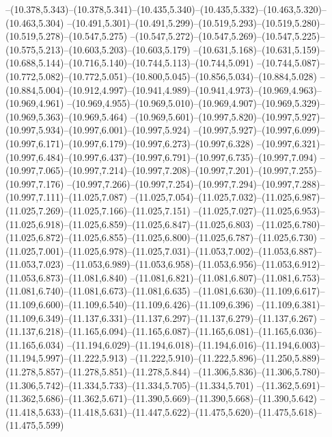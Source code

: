   --(10.378,5.343)--(10.378,5.341)--(10.435,5.340)--(10.435,5.332)--(10.463,5.320)--(10.463,5.304)%
  --(10.491,5.301)--(10.491,5.299)--(10.519,5.293)--(10.519,5.280)--(10.519,5.278)--(10.547,5.275)%
  --(10.547,5.272)--(10.547,5.269)--(10.547,5.225)--(10.575,5.213)--(10.603,5.203)--(10.603,5.179)%
  --(10.631,5.168)--(10.631,5.159)--(10.688,5.144)--(10.716,5.140)--(10.744,5.113)--(10.744,5.091)%
  --(10.744,5.087)--(10.772,5.082)--(10.772,5.051)--(10.800,5.045)--(10.856,5.034)--(10.884,5.028)%
  --(10.884,5.004)--(10.912,4.997)--(10.941,4.989)--(10.941,4.973)--(10.969,4.963)--(10.969,4.961)%
  --(10.969,4.955)--(10.969,5.010)--(10.969,4.907)--(10.969,5.329)--(10.969,5.363)--(10.969,5.464)%
  --(10.969,5.601)--(10.997,5.820)--(10.997,5.927)--(10.997,5.934)--(10.997,6.001)--(10.997,5.924)%
  --(10.997,5.927)--(10.997,6.099)--(10.997,6.171)--(10.997,6.179)--(10.997,6.273)--(10.997,6.328)%
  --(10.997,6.321)--(10.997,6.484)--(10.997,6.437)--(10.997,6.791)--(10.997,6.735)--(10.997,7.094)%
  --(10.997,7.065)--(10.997,7.214)--(10.997,7.208)--(10.997,7.201)--(10.997,7.255)--(10.997,7.176)%
  --(10.997,7.266)--(10.997,7.254)--(10.997,7.294)--(10.997,7.288)--(10.997,7.111)--(11.025,7.087)%
  --(11.025,7.054)--(11.025,7.032)--(11.025,6.987)--(11.025,7.269)--(11.025,7.166)--(11.025,7.151)%
  --(11.025,7.027)--(11.025,6.953)--(11.025,6.918)--(11.025,6.859)--(11.025,6.847)--(11.025,6.803)%
  --(11.025,6.780)--(11.025,6.872)--(11.025,6.855)--(11.025,6.800)--(11.025,6.787)--(11.025,6.730)%
  --(11.025,7.001)--(11.025,6.978)--(11.025,7.031)--(11.053,7.002)--(11.053,6.887)--(11.053,7.023)%
  --(11.053,6.989)--(11.053,6.958)--(11.053,6.956)--(11.053,6.912)--(11.053,6.873)--(11.081,6.840)%
  --(11.081,6.821)--(11.081,6.807)--(11.081,6.753)--(11.081,6.740)--(11.081,6.673)--(11.081,6.635)%
  --(11.081,6.630)--(11.109,6.617)--(11.109,6.600)--(11.109,6.540)--(11.109,6.426)--(11.109,6.396)%
  --(11.109,6.381)--(11.109,6.349)--(11.137,6.331)--(11.137,6.297)--(11.137,6.279)--(11.137,6.267)%
  --(11.137,6.218)--(11.165,6.094)--(11.165,6.087)--(11.165,6.081)--(11.165,6.036)--(11.165,6.034)%
  --(11.194,6.029)--(11.194,6.018)--(11.194,6.016)--(11.194,6.003)--(11.194,5.997)--(11.222,5.913)%
  --(11.222,5.910)--(11.222,5.896)--(11.250,5.889)--(11.278,5.857)--(11.278,5.851)--(11.278,5.844)%
  --(11.306,5.836)--(11.306,5.780)--(11.306,5.742)--(11.334,5.733)--(11.334,5.705)--(11.334,5.701)%
  --(11.362,5.691)--(11.362,5.686)--(11.362,5.671)--(11.390,5.669)--(11.390,5.668)--(11.390,5.642)%
  --(11.418,5.633)--(11.418,5.631)--(11.447,5.622)--(11.475,5.620)--(11.475,5.618)--(11.475,5.599)%
